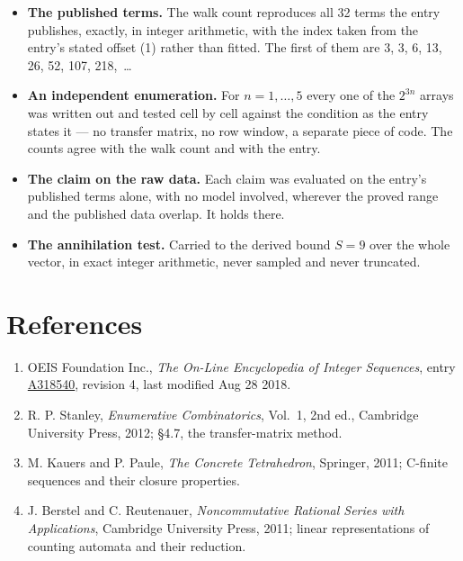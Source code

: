 \documentclass[11pt]{article}
\theoremstyle{definition}
\begin{document}
\begin{itemize}

\item {\bfseries The published terms.} The walk count reproduces all 32 terms the entry publishes, exactly, in integer arithmetic, with the index taken from the entry's stated offset (1) rather than fitted. The first of them are 3, 3, 6, 13, 26, 52, 107, 218,~\dots

\item {\bfseries An independent enumeration.} For $n = 1,\dots,5$ every one of the $2^{3n}$ arrays was written out and tested cell by cell against the condition as the entry states it --- no transfer matrix, no row window, a separate piece of code. The counts agree with the walk count and with the entry.

\item {\bfseries The claim on the raw data.} Each claim was evaluated on the entry's published terms alone, with no model involved, wherever the proved range and the published data overlap. It holds there.

\item {\bfseries The annihilation test.} Carried to the derived bound $S = 9$ over the whole vector, in exact integer arithmetic, never sampled and never truncated.

\end{itemize}

\section{References}

\begin{enumerate}

\item OEIS Foundation Inc., \emph{The On-Line Encyclopedia of Integer Sequences}, entry \href{https://oeis.org/A318540}{A318540}, revision 4, last modified Aug 28 2018.

\item R. P. Stanley, \emph{Enumerative Combinatorics}, Vol.~1, 2nd ed., Cambridge University Press, 2012; \S4.7, the transfer-matrix method.

\item M. Kauers and P. Paule, \emph{The Concrete Tetrahedron}, Springer, 2011; C-finite sequences and their closure properties.

\item J. Berstel and C. Reutenauer, \emph{Noncommutative Rational Series with Applications}, Cambridge University Press, 2011; linear representations of counting automata and their reduction.

\end{enumerate}
\end{document}
